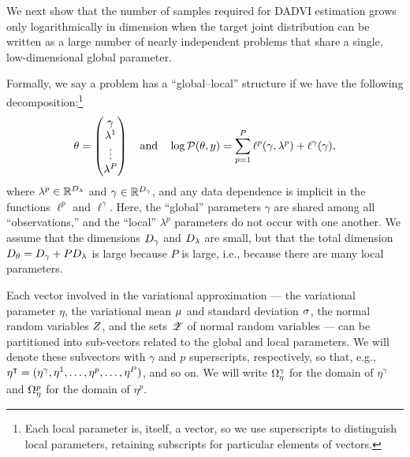 \def\err{\mathcal{E}}
\newcommand{\f}{f} %
\newcommand{\fbar}{\bar{f}} %
\newcommand{\fhat}{\hat{f}} %
\newcommand{\ftil}{\tilde{f}} %

We next show that the number of samples required for DADVI estimation grows only
logarithmically in dimension when the target joint distribution can be written
as a large number of nearly independent problems that share a single,
low-dimensional global parameter. 

Formally, we say a problem has a ``global--local'' structure if we have the
following decomposition:\footnote{Each local parameter is, itself, a vector, so
we use superscripts to distinguish local parameters, retaining subscripts for
particular elements of vectors.}
%
\begin{align}\label{eq:global_local}
%
\theta = \begin{pmatrix}
\gamma\\
\lambda^1 \\
\vdots\\
\lambda^P
\end{pmatrix}
%
\quad\textrm{and}\quad
\logjoint = \sump \ell^p(\gamma, \lambda^p) + \ell^\gamma(\gamma),
%
\end{align}
%
where $\lambda^p \in \mathbb{R}^{D_{\lambda}}$ and $\gamma \in \mathbb{R}^{D_{\gamma}}$, and
any data dependence is implicit in the functions $\ell^p$ and $\ell^\gamma$.
Here, the ``global'' parameters $\gamma$ are shared among all ``observations,''
and the ``local'' $\lambda^p$ parameters do not occur with one another.  We
assume that the dimensions $D_{\gamma}$ and $D_{\lambda}$ are small, but that the
total dimension $D_{\theta} = D_{\gamma} + P D_{\lambda}$ is large because $P$ is
large, i.e., because there are many local parameters.

Each vector involved in the variational approximation --- the variational
parameter $\eta$, the variational mean $\mu_{}$ and standard deviation
$\sigma_{}$, the normal random variables $Z$, and the sets $\mathscr{Z}$ of normal
random variables --- can be partitioned into sub-vectors related to the global
and local parameters. We will denote these subvectors with $\gamma$ and $p$
superscripts, respectively, so that, e.g., $\eta^\intercal = (\eta^\gamma, \eta^1,
\ldots, \eta^p, \ldots, \eta^P)$, and so on.  We will write $\Omega_{\eta}^\gamma$ for
the domain of $\eta^\gamma$ and $\Omega_{\eta}^p$ for the domain of $\eta^p$.

